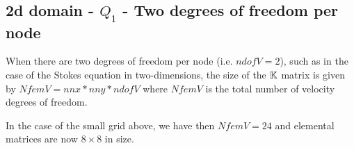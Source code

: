 \subsection{2d domain - $Q_1$ - Two degrees of freedom per node}

When there are two degrees of freedom per node (i.e. $ndofV=2$), such as in the case 
of the Stokes equation in two-dimensions, the size of the ${\mathbb{K}}$ matrix 
is given by $NfemV=nnx*nny*ndofV$ where $NfemV$ is the total number of 
velocity degrees of freedom.

\begin{center}

\end{center}

In the case of the small grid above, we have then $NfemV=24$ and
elemental matrices are now $8\times8$ in size.

